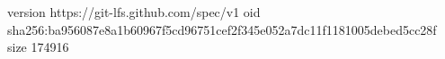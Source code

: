 version https://git-lfs.github.com/spec/v1
oid sha256:ba956087e8a1b60967f5cd96751cef2f345e052a7dc11f1181005debed5cc28f
size 174916
